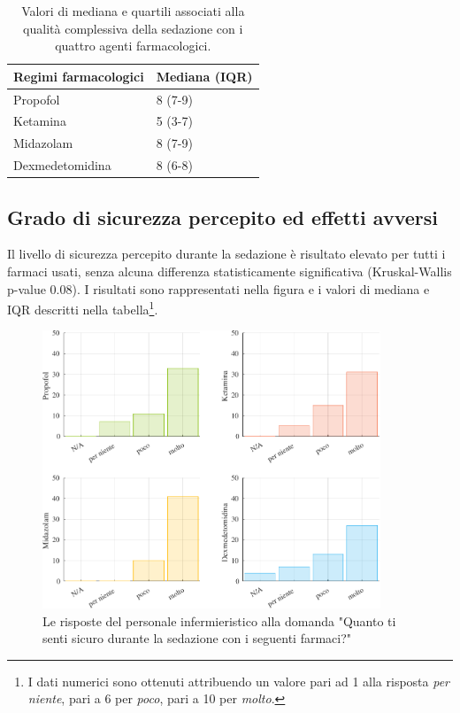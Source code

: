 \bgroup
\def\arraystretch{1.5}
\begin{table}[h]
    \centering
    \begin{tabular}{|l|l|}
         Regimi farmacologici & Mediana (IQR) \\ \hline
       Propofol & 8 (7-9)  \\
       Ketamina & 5 (3-7) \\
       Midazolam & 8 (7-9) \\
       Dexmedetomidina & 8 (6-8) 
    \end{tabular}
    \caption{Valori di mediana e quartili associati alla qualità complessiva della sedazione con i quattro agenti farmacologici.}
    \label{tab:qualitased}
\end{table}
\egroup


\subsection*{Grado di sicurezza percepito ed effetti avversi}

Il livello di sicurezza percepito durante la sedazione è risultato elevato per tutti i farmaci usati, senza alcuna differenza statisticamente significativa (Kruskal-Wallis p-value 0.08). I risultati sono rappresentati nella figura e i valori di mediana e IQR descritti nella tabella\footnote{I dati numerici sono ottenuti attribuendo un valore pari ad 1 alla risposta \emph{per niente}, pari a 6 per \emph{poco}, pari a 10 per \emph{molto}.}.

\begin{figure}[!h]
    \centering
    \includegraphics[width=0.9\textwidth]{Figure/sicurezza.pdf}
    \caption{Le risposte del personale infermieristico alla domanda "Quanto ti senti sicuro durante la sedazione con i seguenti farmaci?"}
    \label{fig:sicurezza}
\end{figure}

